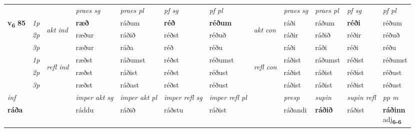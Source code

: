 \begin{longtable}[l]{X>{\footnotesize\itshape}llXXXXlXXXX}
 & &   & \textit{praes sg}  & \textit{praes pl}    & \textit{ pf sg} & \textit{pf pl} & & \textit{praes sg}  & \textit{praes pl}    & \textit{pf sg} & \textit{pf pl }  \\ \cmidrule{4-7} \cmidrule{9-12}
 \multirow{2}{*}{{{\textbf{v{\textsubscript{6}}} \Large{\textbf{85}}}}}  & 1p & \multirow{3}{*}{\begin{turn}{90}\textit{akt ind}\end{turn}} & \textbf{ræð} & ráðum & \textbf{réð} & \textbf{réðum} & \multirow{3}{*}{\begin{turn}{90}\textit{akt con}\end{turn}} &ráði & ráðum & \textbf{réði} & réðum\\*
 & 2p &  &  ræður  & ráðið & réðst & réðuð & & ráðir & ráðið & réðir & réðuð \\*
 & 3p &  & ræður & ráða & réð & réðu & & ráði & ráði& réði & réðu \\*
\cmidrule{4-7} \cmidrule{9-12}
 & 1p & \multirow{3}{*}{\begin{turn}{90}\textit{refl ind}\end{turn}}  & ræðst & ráðumst & réðst & réðumst & \multirow{3}{*}{\begin{turn}{90}\textit{refl con}\end{turn}}  &ráðist & ráðumst & réðist & réðumst \\*
 & 2p &  & ræðst & ráðist & réðst & réðust & &ráðist & ráðist & réðist & réðust \\*
 & 3p  & & ræðst & ráðast & réðst & réðust & & ráðist & ráðist& réðist & réðust \\*
\cmidrule{4-7} \cmidrule{9-12}

   {\textit{inf}} & &  & \textit{imper akt sg} & \textit{imper akt pl} & \textit{imper refl sg} & \textit{imper refl pl} && \textit{presp} & \textit{supin} & \textit{supin refl} & \textit{pp m} \\*
  {\textbf{ráða}} & && ráddu  & ráðið & ráðstu & ráðist && ráðandi &  \textbf{ráðið} & ráðist & \specialcell{\textbf{ráðinn} \\ adj\textbf{\textsubscript{6-6}}} \\*

\midrule


\end{longtable}
